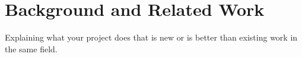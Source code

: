 \chapter{Background and Related Work}

\label{ch:background} 

Explaining what your project does that is new or is better than existing work in the same field.